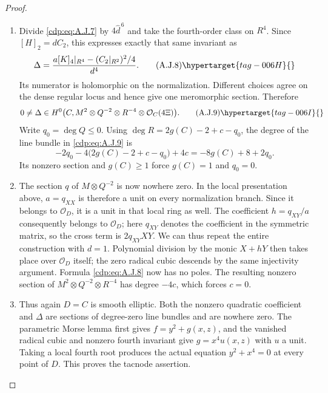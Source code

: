 \begin{proof}
\begin{enumerate}[label={$\langle1\rangle$\arabic*.},leftmargin=*]
\item Divide \eqref{cdp:eq:A.J.7} by $4\widehat d^{\,6}$ and take the
fourth-order class on $R^4$. Since
$[H]_2=dC_2$, this expresses exactly that same invariant as
\[
 \Delta=
 \frac{a[K]_4|_{R^4}-(C_2|_{R^2})^2/4}{d^4}.
                                                        \tag{A.J.8}\hypertarget{tag-006H}{}\label{cdp:eq:A.J.8}
\]
Its numerator is holomorphic on the normalization.
Different choices agree on the dense regular locus and hence
give one meromorphic section. Therefore
\[
 0\ne\Delta\in H^0\bigl(C,M^2\otimes Q^{-2}
                    \otimes R^{-4}\otimes\mathcal O_C(4\Xi)\bigr).
                                                        \tag{A.J.9}\hypertarget{tag-006I}{}\label{cdp:eq:A.J.9}
\]
Write $q_0=\deg Q\leq0$. Using
$\deg R=2g(C)-2+c-q_0$, the degree of the line bundle
in \eqref{cdp:eq:A.J.9} is
\[
 -2q_0-4\bigl(2g(C)-2+c-q_0\bigr)+4c
       =-8g(C)+8+2q_0.
\]
Its nonzero section and $g(C)\geq1$ force
$g(C)=1$ and $q_0=0$.

\item The section $q$ of $M\otimes Q^{-2}$ is now nowhere zero.
In the local presentation above, $a=q_{XX}$ is therefore a
unit on every normalization branch. Since it belongs to
$\mathcal O_D$, it is a unit in that local ring as well.
The coefficient $h=q_{XY}/a$ consequently belongs to
$\mathcal O_D$; here $q_{XY}$ denotes the coefficient in
the symmetric matrix, so the cross term is $2q_{XY}XY$.
We can thus repeat the entire construction with $d=1$.
Polynomial division by the monic $X+hY$ then takes place
over $\mathcal O_D$ itself; the zero radical cubic descends
by the same injectivity argument. Formula \eqref{cdp:eq:A.J.8} now has
no poles. The resulting nonzero section of
$M^2\otimes Q^{-2}\otimes R^{-4}$ has degree $-4c$,
which forces $c=0$.

\item Thus again $D=C$ is smooth elliptic. Both the nonzero
quadratic coefficient and $\Delta$ are sections of
degree-zero line bundles and are nowhere zero. The parametric
Morse lemma first gives $f=y^2+g(x,z)$, and the vanished
radical cubic and nonzero fourth invariant give
$g=x^4u(x,z)$ with $u$ a unit. Taking a local fourth root
produces the actual equation $y^2+x^4=0$ at every point of
$D$. This proves the tacnode assertion.


\end{enumerate}
\end{proof}
